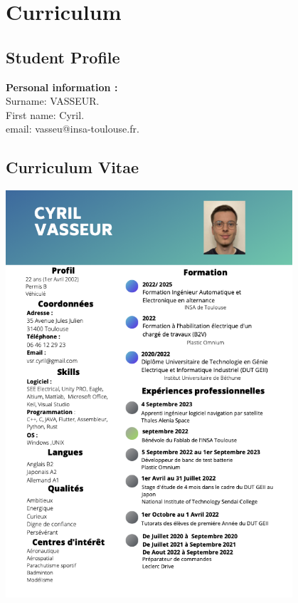 \section{Curriculum}

\subsection{Student Profile}

\textbf{Personal information :} \\
Surname: VASSEUR.  \\
First name: Cyril.  \\
email: vasseu@insa-toulouse.fr.  \\

\subsection{Curriculum Vitae}


\noindent
\begin{minipage}{\textwidth} 
    \centering
    \includegraphics[width=0.8\textwidth]{image/CV_CYRIL VASSEUR.png}
    \label{fig:CV} 
\end{minipage}

